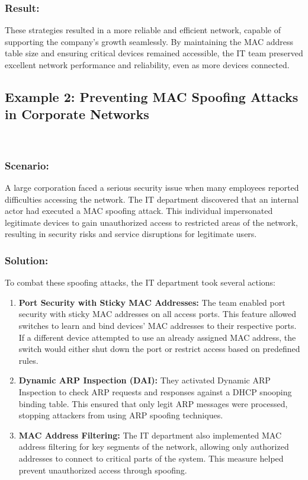 \documentclass[11pt,a4paper]{article}
\begin{document}
\subsubsection*{Result:}
These strategies resulted in a more reliable and efficient network, capable of supporting the company’s growth seamlessly. By maintaining the MAC address table size and ensuring critical devices remained accessible, the IT team preserved excellent network performance and reliability, even as more devices connected.

\subsection*{Example 2: Preventing MAC Spoofing Attacks in Corporate Networks}

\
\subsubsection*{Scenario:}
A large corporation faced a serious security issue when many employees reported difficulties accessing the network. The IT department discovered that an internal actor had executed a MAC spoofing attack. This individual impersonated legitimate devices to gain unauthorized access to restricted areas of the network, resulting in security risks and service disruptions for legitimate users.

\subsubsection*{Solution:}
To combat these spoofing attacks, the IT department took several actions:

\begin{enumerate}
    \item \textbf{Port Security with Sticky MAC Addresses:} The team enabled port security with sticky MAC addresses on all access ports. This feature allowed switches to learn and bind devices' MAC addresses to their respective ports. If a different device attempted to use an already assigned MAC address, the switch would either shut down the port or restrict access based on predefined rules.
    \item \textbf{Dynamic ARP Inspection (DAI):} They activated Dynamic ARP Inspection to check ARP requests and responses against a DHCP snooping binding table. This ensured that only legit ARP messages were processed, stopping attackers from using ARP spoofing techniques.
    \item \textbf{MAC Address Filtering:} The IT department also implemented MAC address filtering for key segments of the network, allowing only authorized addresses to connect to critical parts of the system. This measure helped prevent unauthorized access through spoofing.
\end{enumerate}
\end{document}
